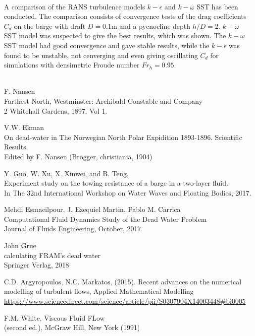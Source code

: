 \documentclass[a4paper, 12pt]{report}
\begin{document}
\\
A comparison of the RANS turbulence models $k-\epsilon$ and $k-\omega$ SST has been conducted. The comparison consists of convergence tests of the drag coefficients $C_d$ on the barge with draft $D=0.1$m and a pycnocline depth $h/D=2$.  $k-\omega$ SST model was suspected to give the best results, which was shown. The $k-\omega$ SST model had good convergence and gave stable results, while the $k-\epsilon$ was found to be unstable, not cenverging and even giving oscillating $C_d$ for simulations with densimetric Froude number $Fr_h= 0.95$.\\
\\
\begin{thebibliography}{9}
	F. Nansen\\
	Farthest North, Westminster: Archibald Constable and Company\\
	2 Whitehall Gardens, 1897. Vol 1.
	
	V.W. Ekman\\
	On dead-water in The Norwegian North Polar Expidition 1893-1896. Scientific Results.\\
	Edited by F. Nansen (Brogger, christiania, 1904)	
	
	Y. Guo, W. Xu, X. Xinwei, and B. Teng,\\
	Experiment study on the towing resistance of a barge in a
two-layer fluid.\\
	In The 32nd International Workshop on Water Waves and Floating Bodies, 2017.
	
	Mehdi Esmaeilpour, J. Ezequiel Martin, Pablo M. Carrica\\
	Computational Fluid Dynamics Study of the Dead Water Problem\\
	Journal of Fluids Engineering, October, 2017.
	
	John Grue\\
	calculating FRAM's dead water\\
	Springer Verlag, 2018
	
	C.D. Argyropoulos, N.C. Markatos, (2015).
	Recent advances on the numerical modelling of turbulent flows, Applied Mathematical Modelling \\
	\url{https://www.sciencedirect.com/science/article/pii/S0307904X14003448#bi0005}

	F.M. White,
	Viscous Fluid FLow \\
	(second ed.), McGraw Hill, New York (1991)
	

\end{thebibliography}
\end{document}
